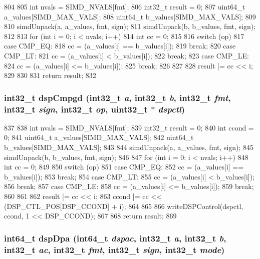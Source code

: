 \begin{DoxyCode}
804 {
805     int nvals = SIMD_NVALS[fmt];
806     int32_t result = 0;
807     uint64_t a_values[SIMD_MAX_VALS];
808     uint64_t b_values[SIMD_MAX_VALS];
809 
810     simdUnpack(a, a_values, fmt, sign);
811     simdUnpack(b, b_values, fmt, sign);
812 
813     for (int i = 0; i < nvals; i++) {
814         int cc = 0;
815 
816         switch (op) {
817           case CMP_EQ:
818             cc = (a_values[i] == b_values[i]);
819             break;
820           case CMP_LT:
821             cc = (a_values[i] < b_values[i]);
822             break;
823           case CMP_LE:
824             cc = (a_values[i] <= b_values[i]);
825             break;
826         }
827 
828         result |= cc << i;
829     }
830 
831     return result;
832 }
\end{DoxyCode}
\hypertarget{namespaceMipsISA_a67fa3d39788e580417830ada4e00b885}{
\subsubsection[{dspCmpgd}]{\setlength{\rightskip}{0pt plus 5cm}int32\_\-t dspCmpgd (int32\_\-t {\em a}, \/  int32\_\-t {\em b}, \/  int32\_\-t {\em fmt}, \/  int32\_\-t {\em sign}, \/  int32\_\-t {\em op}, \/  {\bf uint32\_\-t} $\ast$ {\em dspctl})}}
\label{namespaceMipsISA_a67fa3d39788e580417830ada4e00b885}



\begin{DoxyCode}
837 {
838     int nvals = SIMD_NVALS[fmt];
839     int32_t result = 0;
840     int ccond = 0;
841     uint64_t a_values[SIMD_MAX_VALS];
842     uint64_t b_values[SIMD_MAX_VALS];
843 
844     simdUnpack(a, a_values, fmt, sign);
845     simdUnpack(b, b_values, fmt, sign);
846 
847     for (int i = 0; i < nvals; i++) {
848         int cc = 0;
849 
850         switch (op) {
851           case CMP_EQ:
852             cc = (a_values[i] == b_values[i]);
853             break;
854           case CMP_LT:
855             cc = (a_values[i] < b_values[i]);
856             break;
857           case CMP_LE:
858             cc = (a_values[i] <= b_values[i]);
859             break;
860         }
861 
862         result |= cc << i;
863         ccond |= cc << (DSP_CTL_POS[DSP_CCOND] + i);
864     }
865 
866     writeDSPControl(dspctl, ccond, 1 << DSP_CCOND);
867 
868     return result;
869 }
\end{DoxyCode}
\hypertarget{namespaceMipsISA_aed3186e17a520b2f8e0086ffdd7020d4}{
\subsubsection[{dspDpa}]{\setlength{\rightskip}{0pt plus 5cm}int64\_\-t dspDpa (int64\_\-t {\em dspac}, \/  int32\_\-t {\em a}, \/  int32\_\-t {\em b}, \/  int32\_\-t {\em ac}, \/  int32\_\-t {\em fmt}, \/  int32\_\-t {\em sign}, \/  int32\_\-t {\em mode})}}
\label{namespaceMipsISA_aed3186e17a520b2f8e0086ffdd7020d4}



